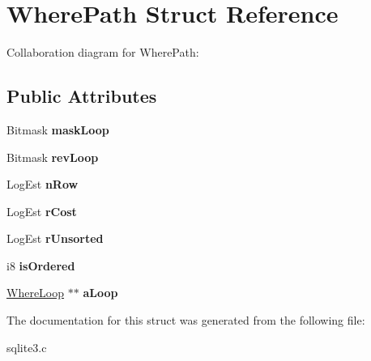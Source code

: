 \hypertarget{structWherePath}{}\section{Where\+Path Struct Reference}
\label{structWherePath}


Collaboration diagram for Where\+Path\+:
\subsection*{Public Attributes}
\begin{DoxyCompactItemize}
\item 
Bitmask {\bfseries mask\+Loop}\hypertarget{structWherePath_a4a0a59d31e51c3a8f9fdfdbfb384ab73}{}\label{structWherePath_a4a0a59d31e51c3a8f9fdfdbfb384ab73}

\item 
Bitmask {\bfseries rev\+Loop}\hypertarget{structWherePath_a6f6bf0a804430fb08f4aadc506f5cc14}{}\label{structWherePath_a6f6bf0a804430fb08f4aadc506f5cc14}

\item 
Log\+Est {\bfseries n\+Row}\hypertarget{structWherePath_ab9e893b128d34fc8bc832de593387c99}{}\label{structWherePath_ab9e893b128d34fc8bc832de593387c99}

\item 
Log\+Est {\bfseries r\+Cost}\hypertarget{structWherePath_a8ca2a9ddc42527170167eb6f08d85878}{}\label{structWherePath_a8ca2a9ddc42527170167eb6f08d85878}

\item 
Log\+Est {\bfseries r\+Unsorted}\hypertarget{structWherePath_a69b10c1c4a8e00814f80144dad12c4ad}{}\label{structWherePath_a69b10c1c4a8e00814f80144dad12c4ad}

\item 
i8 {\bfseries is\+Ordered}\hypertarget{structWherePath_a2793b5b50bc1ec2cf8f9c6e5744c2826}{}\label{structWherePath_a2793b5b50bc1ec2cf8f9c6e5744c2826}

\item 
\hyperlink{structWhereLoop}{Where\+Loop} $\ast$$\ast$ {\bfseries a\+Loop}\hypertarget{structWherePath_a63e12088b414ce0b0b1ee43655733dd1}{}\label{structWherePath_a63e12088b414ce0b0b1ee43655733dd1}

\end{DoxyCompactItemize}


The documentation for this struct was generated from the following file\+:\begin{DoxyCompactItemize}
\item 
sqlite3.\+c\end{DoxyCompactItemize}
